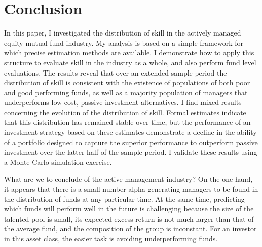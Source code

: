 \section{Conclusion}
	In this paper, I investigated the distribution of skill in the actively managed equity mutual fund industry. My analysis is based on a simple framework for which precise estimation methods are available. I demonstrate how to apply this structure to evaluate skill in the industry as a whole, and also perform fund level evaluations. The results reveal that over an extended sample period the distribution of skill is consistent with the existence of populations of both poor and good performing funds, as well as a majority population of managers that underperforms low cost, passive investment alternatives. I find mixed results concerning the evolution of the distribution of skill. Formal estimates indicate that this distribution has remained stable over time, but the performance of an investment strategy based on these estimates demonstrate a decline in the ability of a portfolio designed to capture the superior performance to outperform passive investment over the latter half of the sample period. I validate these results using a Monte Carlo simulation exercise.

	What are we to conclude of the active management industry? On the one hand, it appears that there is a small number alpha generating managers to be found in the distribution of funds at any particular time. At the same time, predicting which funds will perform well in the future is challenging because the size of the talented pool is small, its expected excess return is not much larger than that of the average fund, and the composition of the group is inconstant. For an investor in this asset class, the easier task is avoiding underperforming funds.
